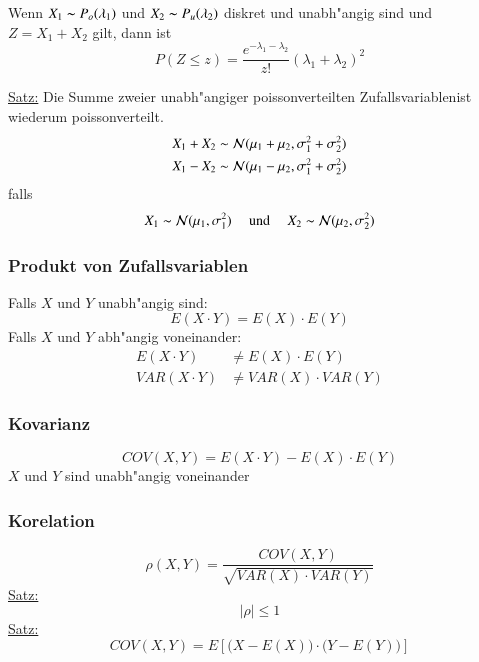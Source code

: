 Wenn $X_1\thicksim P_o(\lambda_1)$ und $X_2\thicksim P_u(\lambda_2)$ diskret und unabh"angig sind
und $Z=X_1+X_2$ gilt, dann ist
\begin{equation}
	P(Z\leq z)=\frac{e^{-\lambda_1-\lambda_2}}{z!}(\lambda_1+\lambda_2)^2
\end{equation}

\underline{Satz:} Die Summe zweier unabh"angiger poissonverteilten Zufallsvariablenist wiederum
poissonverteilt.
\begin{align*}
	X_1+X_2 &\thicksim\mathcal{N}(\mu_1+\mu_2, \sigma^2_1+\sigma^2_2) \\
	X_1-X_2 &\thicksim\mathcal{N}(\mu_1-\mu_2, \sigma^2_1+\sigma^2_2)
\end{align*}
falls
\begin{gather*}
	X_1\thicksim\mathcal{N}(\mu_1,\sigma^2_1)\quad\text{ und }\quad X_2\thicksim\mathcal{N}(\mu_2,\sigma^2_2)
\end{gather*}

\subsubsection{Produkt von Zufallsvariablen}
Falls $X$ und $Y$ unabh"angig sind:
\begin{equation}
	E(X\cdot Y)=E(X)\cdot E(Y)
\end{equation}
Falls $X$ und $Y$ abh"angig voneinander:
\begin{align*}
	E(X\cdot Y) &\neq E(X)\cdot E(Y) \\
	VAR(X\cdot Y) &\neq VAR(X)\cdot VAR(Y)
\end{align*}

\subsubsection{Kovarianz}
\begin{equation}
	COV(X,Y) = E(X\cdot Y)-E(X)\cdot E(Y)
\end{equation}
$X$ und $Y$ sind unabh"angig voneinander

\subsubsection{Korelation}
\begin{equation}
	\rho(X,Y)=\frac{COV(X,Y)}{\sqrt{VAR(X)\cdot VAR(Y)}}
\end{equation}
\underline{Satz:}
\begin{equation}
	|\rho| \leq 1
\end{equation}
\underline{Satz:}
\begin{equation}
	COV(X,Y)=E\left[{\bigl(X-E(X)\bigr)\cdot\bigl(Y-E(Y)\bigr)}\right]
\end{equation}


